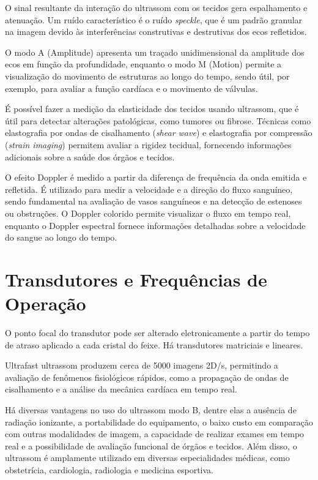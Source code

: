 \documentclass[a4paper,12pt,oneside,openright]{abntex2}
\begin{document}
O sinal resultante da interação do ultrassom com os tecidos gera espalhamento e atenuação. Um ruído característico é o ruído \textit{speckle}, que é um padrão granular na imagem devido às interferências construtivas e destrutivas dos ecos refletidos. 

O modo A (Amplitude) apresenta um traçado unidimensional da amplitude dos ecos em função da profundidade, enquanto o modo M (Motion) permite a visualização do movimento de estruturas ao longo do tempo, sendo útil, por exemplo, para avaliar a função cardíaca e o movimento de válvulas. 

É possível fazer a medição da elasticidade dos tecidos usando ultrassom, que é útil para detectar alterações patológicas, como tumores ou fibrose. Técnicas como elastografia por ondas de cisalhamento (\textit{shear wave}) e elastografia por compressão (\textit{strain imaging}) permitem avaliar a rigidez tecidual, fornecendo informações adicionais sobre a saúde dos órgãos e tecidos.

O efeito Doppler é medido a partir da diferença de frequência da onda emitida e refletida. É utilizado para medir a velocidade e a direção do fluxo sanguíneo, sendo fundamental na avaliação de vasos sanguíneos e na detecção de estenoses ou obstruções. O Doppler colorido permite visualizar o fluxo em tempo real, enquanto o Doppler espectral fornece informações detalhadas sobre a velocidade do sangue ao longo do tempo.

\section{Transdutores e Frequências de Operação}

O ponto focal do transdutor pode ser alterado eletronicamente a partir do tempo de atraso aplicado a cada cristal do feixe. Há transdutores matriciais e lineares.

Ultrafast ultrassom produzem cerca de 5000 imagens 2D/s, permitindo a avaliação de fenômenos fisiológicos rápidos, como a propagação de ondas de cisalhamento e a análise da mecânica cardíaca em tempo real.

Há diversas vantagens no uso do ultrassom modo B, dentre elas a ausência de radiação ionizante, a portabilidade do equipamento, o baixo custo em comparação com outras modalidades de imagem, a capacidade de realizar exames em tempo real e a possibilidade de avaliação funcional de órgãos e tecidos. Além disso, o ultrassom é amplamente utilizado em diversas especialidades médicas, como obstetrícia, cardiologia, radiologia e medicina esportiva.
\end{document}
